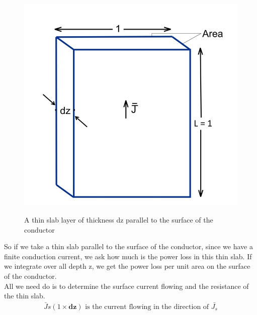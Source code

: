 \begin{figure}
\centering
\textsc{\includegraphics[scale=0.35]{./graphics/slab_parallel_to_conducting_surface}}
\caption{A thin slab layer of thickness dz parallel to the surface of the conductor }
\end{figure}
So if we take a thin slab parallel to the surface of the conductor, since we have a finite conduction current, we ask how much is the power loss in this thin slab. If we integrate over all depth z, we get the power loss per unit area on the surface of the conductor.\\
All we need do is to determine the surface current flowing and the resistance of the thin slab.
\begin{align*}
\bar{J}s(1\times\textbf{dz}) \text{ is the current flowing in the direction of } \bar{J_{s}}
\end{align*}

